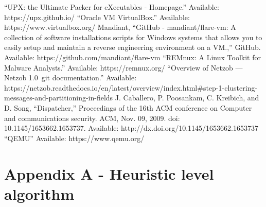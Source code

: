 \documentclass[conference]{IEEEtran}
\begin{document}
\begin{thebibliography}{00}
     “UPX: the Ultimate Packer for eXecutables - Homepage.” Available: https://upx.github.io/
     “Oracle VM VirtualBox.” Available: https://www.virtualbox.org/
     Mandiant, “GitHub - mandiant/flare-vm: A collection of software installations scripts for Windows systems that allows you to easily setup and maintain a reverse engineering environment on a VM.,” GitHub. Available: https://github.com/mandiant/flare-vm
     “REMnux: A Linux Toolkit for Malware Analysts.” Available: https://remnux.org/
     “Overview of Netzob — Netzob 1.0~git documentation.” Available: https://netzob.readthedocs.io/en/latest/overview/index.html\#step-1-clustering-messages-and-partitioning-in-fields
     J. Caballero, P. Poosankam, C. Kreibich, and D. Song, “Dispatcher,” Proceedings of the 16th ACM conference on Computer and communications security. ACM, Nov. 09, 2009. doi: 10.1145/1653662.1653737. Available: http://dx.doi.org/10.1145/1653662.1653737
     “QEMU” Available: https://www.qemu.org/

\end{thebibliography}
\vspace{12pt}

\newpage
\section*{Appendix A - Heuristic level algorithm}\label{appendix:heuristic_level_alg}
\end{document}
